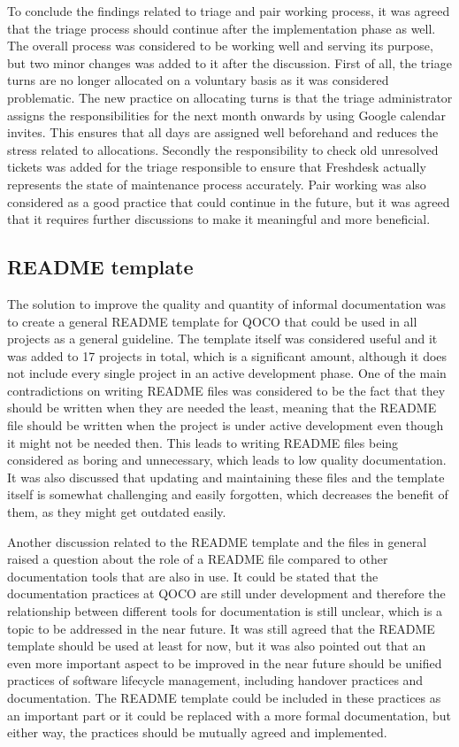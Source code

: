 To conclude the findings related to triage and pair working process, it was agreed that the triage process should continue after the implementation phase as well. The overall process was considered to be working
well and serving its purpose, but two minor changes was added to it after the discussion. First of all, the triage turns are no longer allocated on a voluntary basis as it was considered problematic. The new 
practice on allocating turns is that the triage administrator assigns the responsibilities for the next month onwards by using Google calendar invites. This ensures that all days are assigned well beforehand
and reduces the stress related to allocations. Secondly the responsibility to check old unresolved tickets was added for the triage responsible to ensure that Freshdesk actually represents the state of
maintenance process accurately. Pair working was also considered as a good practice that could continue in the future, but it was agreed that it requires further discussions to make it meaningful and more
beneficial.

\subsection{README template}

The solution to improve the quality and quantity of informal documentation was to create a general README template for QOCO that could be used in all projects as a general guideline. The template itself was considered
useful and it was added to 17 projects in total, which is a significant amount, although it does not include every single project in an active development phase. One of the main contradictions on
writing README files was considered to be the fact that they should be written when they are needed the least, meaning that the README file should be written when the project is under active development even though
it might not be needed then. This leads to writing README files being considered as boring and unnecessary, which leads to low quality documentation. It was also discussed that updating and maintaining these files
and the template itself is somewhat challenging and easily forgotten, which decreases the benefit of them, as they might get outdated easily.

Another discussion related to the README template and the files in general raised a question about the role of a README file compared to other documentation tools that are also in use. It could be stated that the
documentation practices at QOCO are still under development and therefore the relationship between different tools for documentation is still unclear, which is a topic to be addressed in the near future. It was still
agreed that the README template should be used at least for now, but it was also pointed out that an even more important aspect to be improved in the near future should be unified practices of software
lifecycle management, including handover practices and documentation. The README template could be included in these practices as an important part or it could be replaced with a more formal documentation,
but either way, the practices should be mutually agreed and implemented.

